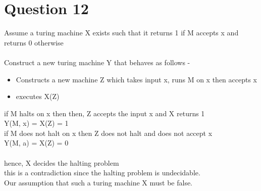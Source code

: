 \documentclass[11pt]{article}
\begin{document}
\section*{Question 12}
Assume a turing machine X exists such that it returns 1 if M accepts x and returns 0
otherwise \\
\\
Construct a new turing machine Y that behaves as follows -
\begin{itemize}
    \item Constructs a new machine Z which takes input x, runs M on x then accepts x
    \item executes X(Z)
\end{itemize}
if M halts on x then then, Z accepts the input x and X returns 1 \\
Y(M, x) = X(Z) = 1 \\
if M does not halt on x then Z does not halt and does not accept x \\
Y(M, a) = X(Z) = 0 \\
\\
hence, X decides the halting problem \\
this is a contradiction since the halting problem is undecidable. \\
Our assumption that such a turing machine X must be false.
\end{document}
